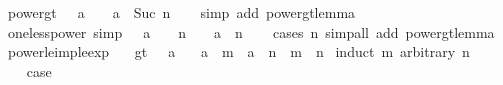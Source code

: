 \begin{isabellebody}
\isanewline
{}\isamarkupfalse%
\ power{\isacharunderscore}{\kern0pt}gt{}{\isacharcolon}{\kern0pt}\ {\isachardoublequoteopen}{}\ {\isacharless}{\kern0pt}\ a\ {\isasymLongrightarrow}\ {}\ {\isacharless}{\kern0pt}\ a\ {\isacharcircum}{\kern0pt}\ Suc\ n{\isachardoublequoteclose}\isanewline
%
\isadelimproof
\ \ %
\endisadelimproof
%
\isatagproof
{}\isamarkupfalse%
\ {\isacharparenleft}{\kern0pt}simp\ add{\isacharcolon}{\kern0pt}\ power{\isacharunderscore}{\kern0pt}gt{}{\isacharunderscore}{\kern0pt}lemma{\isacharparenright}{\kern0pt}%
\endisatagproof
{\isafoldproof}%
%
\isadelimproof
\isanewline
%
\endisadelimproof
\isanewline
{}\isamarkupfalse%
\ one{\isacharunderscore}{\kern0pt}less{\isacharunderscore}{\kern0pt}power\ {\isacharbrackleft}{\kern0pt}simp{\isacharbrackright}{\kern0pt}{\isacharcolon}{\kern0pt}\ {\isachardoublequoteopen}{}\ {\isacharless}{\kern0pt}\ a\ {\isasymLongrightarrow}\ {}\ {\isacharless}{\kern0pt}\ n\ {\isasymLongrightarrow}\ {}\ {\isacharless}{\kern0pt}\ a\ {\isacharcircum}{\kern0pt}\ n{\isachardoublequoteclose}\isanewline
%
\isadelimproof
\ \ %
\endisadelimproof
%
\isatagproof
{}\isamarkupfalse%
\ {\isacharparenleft}{\kern0pt}cases\ n{\isacharparenright}{\kern0pt}\ {\isacharparenleft}{\kern0pt}simp{\isacharunderscore}{\kern0pt}all\ add{\isacharcolon}{\kern0pt}\ power{\isacharunderscore}{\kern0pt}gt{}{\isacharunderscore}{\kern0pt}lemma{\isacharparenright}{\kern0pt}%
\endisatagproof
{\isafoldproof}%
%
\isadelimproof
\isanewline
%
\endisadelimproof
\isanewline
{}\isamarkupfalse%
\ power{\isacharunderscore}{\kern0pt}le{\isacharunderscore}{\kern0pt}imp{\isacharunderscore}{\kern0pt}le{\isacharunderscore}{\kern0pt}exp{\isacharcolon}{\kern0pt}\isanewline
\ \ \ gt{}{\isacharcolon}{\kern0pt}\ {\isachardoublequoteopen}{}\ {\isacharless}{\kern0pt}\ a{\isachardoublequoteclose}\isanewline
\ \ \ {\isachardoublequoteopen}a\ {\isacharcircum}{\kern0pt}\ m\ {\isasymle}\ a\ {\isacharcircum}{\kern0pt}\ n\ {\isasymLongrightarrow}\ m\ {\isasymle}\ n{\isachardoublequoteclose}\isanewline
%
\isadelimproof
%
\endisadelimproof
%
\isatagproof
{}\isamarkupfalse%
\ {\isacharparenleft}{\kern0pt}induct\ m\ arbitrary{\isacharcolon}{\kern0pt}\ n{\isacharparenright}{\kern0pt}\isanewline
\ \ \isamarkupfalse%
\ {}\isanewline
\ \ \isamarkupfalse%
\ {\isacharquery}{\kern0pt}case\ \isamarkupfalse%

\end{isabellebody}
